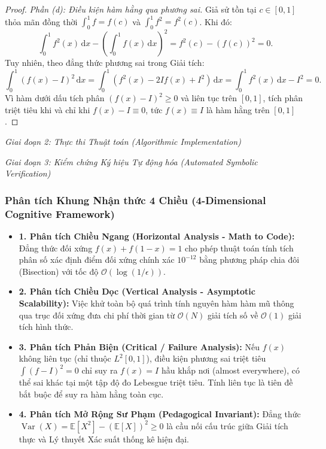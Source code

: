 \documentclass{article}
\begin{document}
\begin{proof}
\emph{Phần (d): Điều kiện hàm hằng qua phương sai.}
Giả sử tồn tại $c \in [0, 1]$ thỏa mãn đồng thời $\int_0^1 f = f(c)$ và $\int_0^1 f^2 = f^2(c)$. Khi đó:
\begin{equation}
    \int_0^1 f^2(x)\,\mathrm{d}x - \left(\int_0^1 f(x)\,\mathrm{d}x\right)^2 = f^2(c) - (f(c))^2 = 0.
\end{equation}
Tuy nhiên, theo đẳng thức phương sai trong Giải tích:
\begin{equation}
    \int_0^1 (f(x) - I)^2\,\mathrm{d}x = \int_0^1 \left(f^2(x) - 2I f(x) + I^2\right)\,\mathrm{d}x = \int_0^1 f^2(x)\,\mathrm{d}x - I^2 = 0.
\end{equation}
Vì hàm dưới dấu tích phân $(f(x) - I)^2 \ge 0$ và liên tục trên $[0, 1]$, tích phân triệt tiêu khi và chỉ khi $f(x) - I \equiv 0$, tức $f(x) \equiv I$ là hàm hằng trên $[0, 1]$.
\end{proof}

\vspace{0.5em}\noindent\emph{Giai đoạn 2: Thực thi Thuật toán (Algorithmic Implementation)}


\vspace{0.5em}\noindent\emph{Giai đoạn 3: Kiểm chứng Ký hiệu Tự động hóa (Automated Symbolic Verification)}


\subsubsection*{Phân tích Khung Nhận thức 4 Chiều (4-Dimensional Cognitive Framework)}
\begin{itemize}
    \item \textbf{1. Phân tích Chiều Ngang (Horizontal Analysis - Math to Code):} Đẳng thức đối xứng $f(x) + f(1-x) = 1$ cho phép thuật toán tính tích phân số xác định điểm đối xứng chính xác $10^{-12}$ bằng phương pháp chia đôi (Bisection) với tốc độ $\mathcal{O}(\log(1/\epsilon))$.
    \item \textbf{2. Phân tích Chiều Dọc (Vertical Analysis - Asymptotic Scalability):} Việc khử toàn bộ quá trình tính nguyên hàm hàm mũ thông qua trục đối xứng đưa chi phí thời gian từ $\mathcal{O}(N)$ giải tích số về $\mathcal{O}(1)$ giải tích hình thức.
    \item \textbf{3. Phân tích Phản Biện (Critical / Failure Analysis):} Nếu $f(x)$ không liên tục (chỉ thuộc $L^2[0, 1]$), điều kiện phương sai triệt tiêu $\int (f - I)^2 = 0$ chỉ suy ra $f(x) = I$ hầu khắp nơi (almost everywhere), có thể sai khác tại một tập độ đo Lebesgue triệt tiêu. Tính liên tục là tiên đề bắt buộc để suy ra hàm hằng toàn cục.
    \item \textbf{4. Phân tích Mở Rộng Sư Phạm (Pedagogical Invariant):} Đẳng thức $\operatorname{Var}(X) = \mathbb{E}[X^2] - (\mathbb{E}[X])^2 \ge 0$ là cầu nối cấu trúc giữa Giải tích thực và Lý thuyết Xác suất thống kê hiện đại.
\end{itemize}
\end{document}
